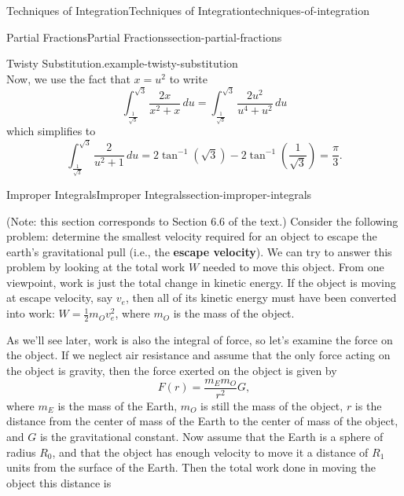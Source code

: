 \documentclass[oneside,10pt,]{book}
\newcommand{\terminology}[1]{\textbf{#1}}
\numberwithin{equation}{section}
\begin{document}
\begin{chapterptx}{Techniques of Integration}{}{Techniques of Integration}{}{}{techniques-of-integration}
\begin{sectionptx}{Partial Fractions}{}{Partial Fractions}{}{}{section-partial-fractions}
\begin{example}{Twisty Substitution.}{example-twisty-substitution}
\begin{equation*}
\end{equation*}
Now, we use the fact that \(x = u^{2}\) to write%
\begin{equation*}
\int_{\frac{1}{\sqrt{3}}}^{\sqrt{3}}\frac{2x}{x^{2} + x}\,du = \int_{\frac{1}{\sqrt{3}}}^{\sqrt{3}}\frac{2u^{2}}{u^{4} + u^{2}}\,du
\end{equation*}
which simplifies to%
\begin{equation*}
\int_{\frac{1}{\sqrt{3}}}^{\sqrt{3}}\frac{2}{u^{2} + 1}\,du = 2\tan^{-1}(\sqrt{3}) - 2\tan^{-1}\left(\frac{1}{\sqrt{3}}\right) = \frac{\pi}{3}.
\end{equation*}
%
\end{example}
\end{sectionptx}
%
%
\typeout{************************************************}
\typeout{************************************************}
%
\begin{sectionptx}{Improper Integrals}{}{Improper Integrals}{}{}{section-improper-integrals}
\begin{introduction}{}%
\hypertarget{p-574}{}%
(Note: this section corresponds to Section 6.6 of the text.) Consider the following problem: determine the smallest velocity required for an object to escape the earth's gravitational pull (i.e., the \terminology{escape velocity}). We can try to answer this problem by looking at the total work \(W\) needed to move this object. From one viewpoint, work is just the total change in kinetic energy. If the object is moving at escape velocity, say \(v_{e}\), then all of its kinetic energy must have been converted into work: \(W = \frac{1}{2}m_{O}v_{e}^{2}\), where \(m_{O}\) is the mass of the object.%
\par
\hypertarget{p-575}{}%
As we'll see later, work is also the integral of force, so let's examine the force on the object. If we neglect air resistance and assume that the only force acting on the object is gravity, then the force exerted on the object is given by%
\begin{equation*}
F(r) = \frac{m_{E}m_{O}}{r^{2}}G,
\end{equation*}
where \(m_{E}\) is the mass of the Earth, \(m_{O}\) is still the mass of the object, \(r\) is the distance from the center of mass of the Earth to the center of mass of the object, and \(G\) is the gravitational constant. Now assume that the Earth is a sphere of radius \(R_{0}\), and that the object has enough velocity to move it a distance of \(R_{1}\) units from the surface of the Earth. Then the total work done in moving the object this distance is%

\end{introduction}
\end{sectionptx}
\end{chapterptx}
\end{document}
